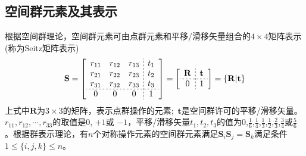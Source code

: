 \documentclass{article}      %
\newcommand{\upcite}[1]{\hspace{0ex}\textsuperscript{\cite{#1}}} %
\begin{document}
\subsection{空间群元素及其表示}
根据空间群理论，空间群元素可由点群元素和平移/滑移矢量组合的$4\times4$矩阵表示(称为\textrm{Seitz}矩阵表示)\upcite{AnnMath37-17_1936,Bradley-Cracknell_1972}
\begin{equation}
	\mathbf{S}=\left[\begin{array}{ccc;{2pt/2pt}c}
		r_{11} &r_{12} &r_{13} & t_1 \\
		r_{21} &r_{22} &r_{23} & t_2 \\
		r_{31} &r_{32} &r_{33} & t_3 \\
\hdashline[2pt/2pt]
0 & 0 &0 & 1
\end{array}\right]
=\left[\begin{array}{c;{2pt/2pt}c}
		\mathbf{R} & \mathbf{t} \\
\hdashline[2pt/2pt]
0 & 1
\end{array}\right]
=\{\mathbf{R}|\mathbf{t}\}
	\label{equation:S-matrix}
\end{equation}
上式中$\mathbf{R}$为$3\times3$的矩阵，表示点群操作的元素;~$\mathbf{t}$是空间群许可的平移/滑移矢量。$r_{11},r_{12},\cdots,r_{33}$的取值是$0$, $+1$或 $-1$，平移/滑移矢量$t_1,t_2,t_3$的值为$0$,$\frac16$,$\frac14$,$\frac13$,$\frac12$,$\frac23$,$\frac34$或$\frac56$。根据群表示理论，有$n$个对称操作元素的空间群元素满足$\mathbf{S}_i\mathbf{S}_j=\mathbf{S}_k$满足条件$1\leqslant\{i,j,k\}\leqslant n$。
\end{document}

